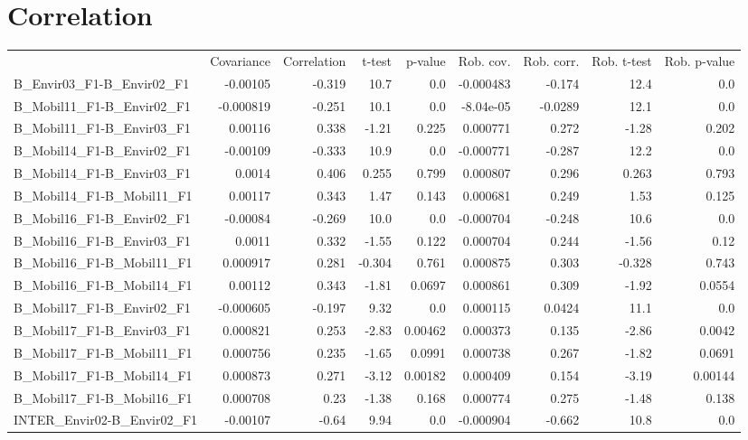 \section{Correlation}
\begin{tabular}{lrrrrrrrr}
 & Covariance & Correlation & t-test & p-value & Rob. cov. & Rob. corr. & Rob. t-test & Rob. p-value \\
B_Envir03_F1-B_Envir02_F1 & -0.00105 & -0.319 & 10.7 & 0.0 & -0.000483 & -0.174 & 12.4 & 0.0 \\
B_Mobil11_F1-B_Envir02_F1 & -0.000819 & -0.251 & 10.1 & 0.0 & -8.04e-05 & -0.0289 & 12.1 & 0.0 \\
B_Mobil11_F1-B_Envir03_F1 & 0.00116 & 0.338 & -1.21 & 0.225 & 0.000771 & 0.272 & -1.28 & 0.202 \\
B_Mobil14_F1-B_Envir02_F1 & -0.00109 & -0.333 & 10.9 & 0.0 & -0.000771 & -0.287 & 12.2 & 0.0 \\
B_Mobil14_F1-B_Envir03_F1 & 0.0014 & 0.406 & 0.255 & 0.799 & 0.000807 & 0.296 & 0.263 & 0.793 \\
B_Mobil14_F1-B_Mobil11_F1 & 0.00117 & 0.343 & 1.47 & 0.143 & 0.000681 & 0.249 & 1.53 & 0.125 \\
B_Mobil16_F1-B_Envir02_F1 & -0.00084 & -0.269 & 10.0 & 0.0 & -0.000704 & -0.248 & 10.6 & 0.0 \\
B_Mobil16_F1-B_Envir03_F1 & 0.0011 & 0.332 & -1.55 & 0.122 & 0.000704 & 0.244 & -1.56 & 0.12 \\
B_Mobil16_F1-B_Mobil11_F1 & 0.000917 & 0.281 & -0.304 & 0.761 & 0.000875 & 0.303 & -0.328 & 0.743 \\
B_Mobil16_F1-B_Mobil14_F1 & 0.00112 & 0.343 & -1.81 & 0.0697 & 0.000861 & 0.309 & -1.92 & 0.0554 \\
B_Mobil17_F1-B_Envir02_F1 & -0.000605 & -0.197 & 9.32 & 0.0 & 0.000115 & 0.0424 & 11.1 & 0.0 \\
B_Mobil17_F1-B_Envir03_F1 & 0.000821 & 0.253 & -2.83 & 0.00462 & 0.000373 & 0.135 & -2.86 & 0.0042 \\
B_Mobil17_F1-B_Mobil11_F1 & 0.000756 & 0.235 & -1.65 & 0.0991 & 0.000738 & 0.267 & -1.82 & 0.0691 \\
B_Mobil17_F1-B_Mobil14_F1 & 0.000873 & 0.271 & -3.12 & 0.00182 & 0.000409 & 0.154 & -3.19 & 0.00144 \\
B_Mobil17_F1-B_Mobil16_F1 & 0.000708 & 0.23 & -1.38 & 0.168 & 0.000774 & 0.275 & -1.48 & 0.138 \\
INTER_Envir02-B_Envir02_F1 & -0.00107 & -0.64 & 9.94 & 0.0 & -0.000904 & -0.662 & 10.8 & 0.0 \\

\end{tabular}
